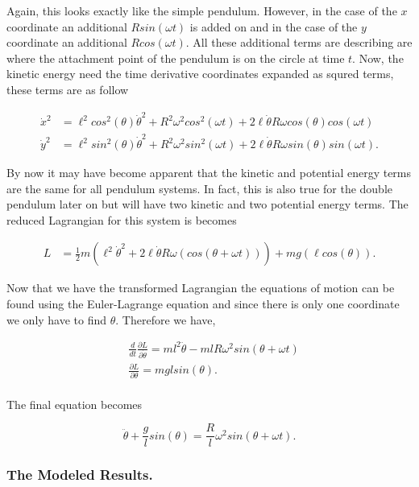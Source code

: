 \documentclass[runningheads]{llncs}
\begin{document}
Again, this looks exactly like the simple pendulum. However, in the case of the $x$ coordinate an additional $Rsin(\omega t)$ is added on and in the case of the $y$ coordinate an additional $Rcos(\omega t)$. All these additional terms are describing are where the attachment point of the pendulum is on the circle at time $t$. Now, the kinetic energy need the time derivative coordinates expanded as squred terms, these terms are as follow

\begin{align*}
\dot{x}^{2} &= \ell^{2}cos^{2}(\theta) \dot{\theta}^{2} + R^{2}\omega^{2}cos^{2}(\omega t) + 2\ell \dot{\theta}R\omega cos(\theta)cos(\omega t) \\
\dot{y}^{2} &= \ell^{2}sin^{2}(\theta) \dot{\theta}^{2} + R^{2}\omega^{2}sin^{2}(\omega t) + 2\ell \dot{\theta}R\omega sin(\theta)sin(\omega t).
\end{align*}

By now it may have become apparent that the kinetic and potential energy terms are the same for all pendulum systems. In fact, this is also true for the double pendulum later on but will have two kinetic and two potential energy terms. The reduced Lagrangian for this system is becomes

\begin{align*}
L &= \frac{1}{2}m(\ell^{2} \dot{\theta}^{2} + 2\ell \dot{\theta}R\omega(cos(\theta + \omega t))) + mg(\ell cos(\theta)).
\end{align*}


Now that we have the transformed Lagrangian the equations of motion can be found using the Euler-Lagrange equation and since there is only one coordinate we only have to find $\theta$. Therefore we have,


\begin{align*}
&\frac{d}{dt} \frac{\partial L}{\partial \dot{\theta}} = ml^{2}\ddot{\theta} -ml R\omega^{2}sin(\theta + \omega t)\\
& \frac{\partial L}{\partial \theta} =  mglsin(\theta). \\
\end{align*}

\noindent
The final equation becomes

$$
\ddot{\theta} + \frac{g}{l}sin(\theta) = \frac{R}{l}\omega^{2}sin(\theta + \omega t).
$$

\subsubsection{The Modeled Results.}
\end{document}
